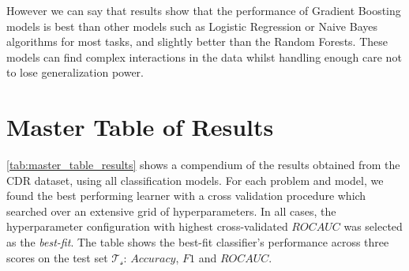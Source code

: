 However we can say that results show that the performance of Gradient Boosting models is best than other models such as Logistic Regression or Naive Bayes algorithms for most tasks, and slightly better than the Random Forests.
These models can find complex interactions in the data whilst handling enough care not to lose generalization power.




\section{Master Table of Results}\label{sec:master_table}

\cref{tab:master_table_results} shows a compendium of the results obtained from the CDR dataset, using all classification models.
For each problem and model, we found the best performing learner with a cross validation procedure which searched over an extensive grid of hyperparameters.
In all cases, the hyperparameter configuration with highest cross-validated $ROC AUC$ was selected as the \textit{best-fit}.
The table shows the best-fit classifier's performance across three scores on the test set $\mathcal{T_s}$: $Accuracy$, $F1$ and $ROC AUC$.



